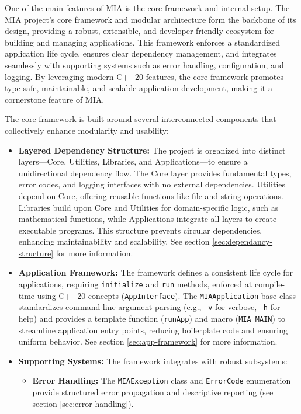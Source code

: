 One of the main features of MIA is the core framework and internal setup. The MIA project's core framework and modular architecture form the backbone of its design, providing a robust, extensible, and developer-friendly ecosystem for building and managing applications. This framework enforces a standardized application life cycle, ensures clear dependency management, and integrates seamlessly with supporting systems such as error handling, configuration, and logging. By leveraging modern C++20 features, the core framework promotes type-safe, maintainable, and scalable application development, making it a cornerstone feature of MIA.

The core framework is built around several interconnected components that collectively enhance modularity and usability:
\begin{itemize}\itemsep0em
	\item \textbf{Layered Dependency Structure:} The project is organized into distinct layers---Core, Utilities, Libraries, and Applications---to ensure a unidirectional dependency flow. The Core layer provides fundamental types, error codes, and logging interfaces with no external dependencies. Utilities depend on Core, offering reusable functions like file and string operations. Libraries build upon Core and Utilities for domain-specific logic, such as mathematical functions, while Applications integrate all layers to create executable programs. This structure prevents circular dependencies, enhancing maintainability and scalability. See section \ref{sec:dependancy-structure} for more information.
	\item \textbf{Application Framework:} The framework defines a consistent life cycle for applications, requiring \texttt{initialize} and \texttt{run} methods, enforced at compile-time using C++20 concepts (\texttt{AppInterface}). The \texttt{MIAApplication} base class standardizes command-line argument parsing (e.g., \texttt{-v} for verbose, \texttt{-h} for help) and provides a template function (\texttt{runApp}) and macro (\texttt{MIA\_MAIN}) to streamline application entry points, reducing boilerplate code and ensuring uniform behavior. See section \ref{sec:app-framework} for more information.
	\item \textbf{Supporting Systems:} The framework integrates with robust subsystems:
	\begin{itemize}\itemsep0em
		\item \textbf{Error Handling:} The \texttt{MIAException} class and \texttt{ErrorCode} enumeration provide structured error propagation and descriptive reporting (see section \ref{sec:error-handling}).

\end{itemize}
\end{itemize}
